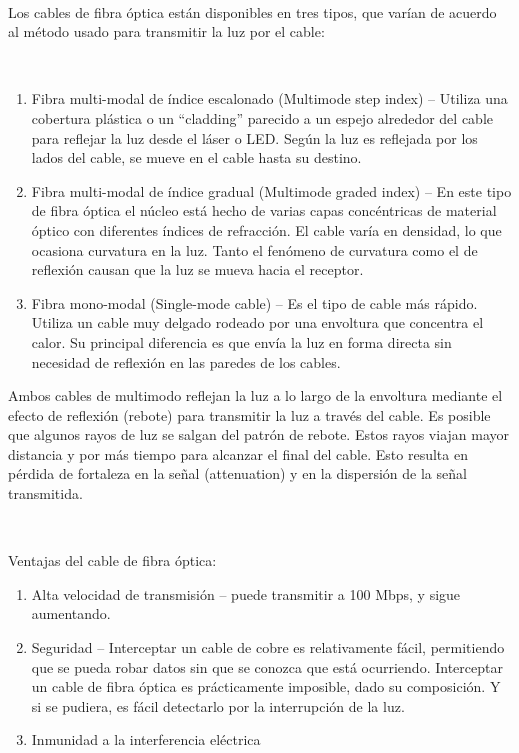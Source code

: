 ~

Los cables de fibra óptica están disponibles en tres tipos, que varían
de acuerdo al método usado para transmitir la luz por el cable:

~

\begin{enumerate}
\def\labelenumi{\arabic{enumi}.}
\item
  Fibra multi-modal de índice escalonado (Multimode step index) --
  Utiliza una cobertura plástica o un ``cladding'' parecido a un espejo
  alrededor del cable para reflejar la luz desde el láser o LED. Según
  la luz es reflejada por los lados del cable, se mueve en el cable
  hasta su destino.
\item
  Fibra multi-modal de índice gradual (Multimode graded index) -- En
  este tipo de fibra óptica el núcleo está hecho de varias capas
  concéntricas de material óptico con diferentes índices de refracción.
  El cable varía en densidad, lo que ocasiona curvatura en la luz. Tanto
  el fenómeno de curvatura como el de reflexión causan que la luz se
  mueva hacia el receptor.
\item
  Fibra mono-modal (Single-mode cable) -- Es el tipo de cable más
  rápido. Utiliza un cable muy delgado rodeado por una envoltura que
  concentra el calor. Su principal diferencia es que envía la luz en
  forma directa sin necesidad de reflexión en las paredes de los cables.
\end{enumerate}

Ambos cables de multimodo reflejan la luz a lo largo de la envoltura
mediante el efecto de reflexión (rebote) para transmitir la luz a través
del cable. Es posible que algunos rayos de luz se salgan del patrón de
rebote. Estos rayos viajan mayor distancia y por más tiempo para
alcanzar el final del cable. Esto resulta en pérdida de fortaleza en la
señal (attenuation) y en la dispersión de la señal transmitida.

~

Ventajas del cable de fibra óptica:

\begin{enumerate}
\def\labelenumi{\arabic{enumi}.}
\item
  Alta velocidad de transmisión -- puede transmitir a 100 Mbps, y sigue
  aumentando.
\item
  Seguridad -- Interceptar un cable de cobre es relativamente fácil,
  permitiendo que se pueda robar datos sin que se conozca que está
  ocurriendo. Interceptar un cable de fibra óptica es prácticamente
  imposible, dado su composición. Y si se pudiera, es fácil detectarlo
  por la interrupción de la luz.
\item
  Inmunidad a la interferencia eléctrica
\end{enumerate}

